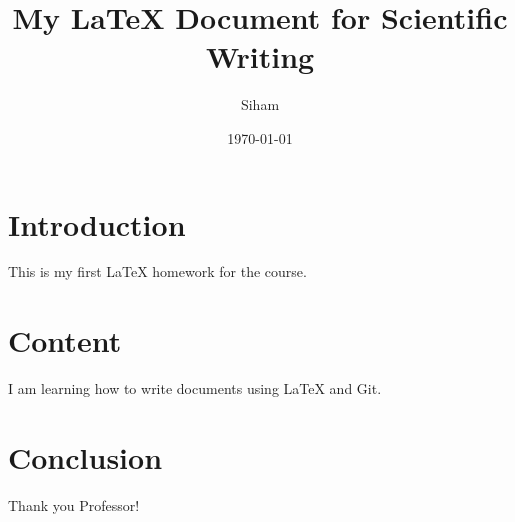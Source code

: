\documentclass{article}
\title{My LaTeX Document for Scientific Writing}
\author{Siham}
\date{\today}
\begin{document}
\maketitle

\section{Introduction}
This is my first LaTeX homework for the course.

\section{Content}
I am learning how to write documents using LaTeX and Git.

\section{Conclusion}
Thank you Professor!
\end{document}
